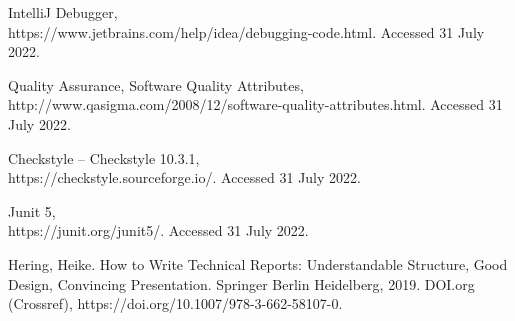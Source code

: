 \documentclass[12pt, a4paper]{article}
\begin{document}
\begin{thebibliography}{20}
IntelliJ Debugger,\\
https://www.jetbrains.com/help/idea/debugging-code.html. Accessed 31 July 2022.

Quality Assurance, Software Quality Attributes,\\
http://www.qasigma.com/2008/12/software-quality-attributes.html. Accessed 31 July 2022.


Checkstyle – Checkstyle 10.3.1,\\
https://checkstyle.sourceforge.io/. Accessed 31 July 2022.

Junit 5,\\
https://junit.org/junit5/. Accessed 31 July 2022.

Hering, Heike. How to Write Technical Reports: Understandable Structure, Good Design, Convincing Presentation. Springer Berlin Heidelberg, 2019. DOI.org (Crossref), https://doi.org/10.1007/978-3-662-58107-0.

\end{thebibliography}

\newpage
\end{document}
